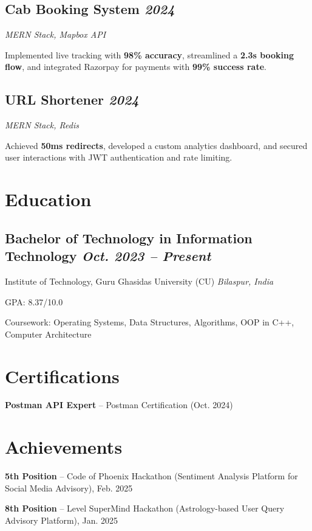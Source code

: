 \documentclass[10pt]{article}
\newcommand{\resitem}[1]{\item \RaggedRight #1}
\newcommand{\role}[1]{\textbf{#1}}
\newcommand{\company}[1]{#1}
\newcommand{\location}[1]{\textit{#1}}
\newcommand{\dates}[1]{\hfill \textit{#1}}
\begin{document}
\subsection*{\role{Cab Booking System} \dates{2024}}
\textit{MERN Stack, Mapbox API}
\begin{resumeitems}
    \resitem{Implemented live tracking with \textbf{98\% accuracy}, streamlined a \textbf{2.3s booking flow}, and integrated Razorpay for payments with \textbf{99\% success rate}.}
\end{resumeitems}

\subsection*{\role{URL Shortener} \dates{2024}}
\textit{MERN Stack, Redis}
\begin{resumeitems}
    \resitem{Achieved \textbf{50ms redirects}, developed a custom analytics dashboard, and secured user interactions with JWT authentication and rate limiting.}
\end{resumeitems}

\section*{Education}
\subsection*{\role{Bachelor of Technology in Information Technology} \dates{Oct. 2023 – Present}}
\company{Institute of Technology, Guru Ghasidas University (CU)} \location{Bilaspur, India}
\begin{resumeitems}
    \resitem{GPA: 8.37/10.0}
    \resitem{Coursework: Operating Systems, Data Structures, Algorithms, OOP in C++, Computer Architecture}
\end{resumeitems}

\section*{Certifications}
\begin{resumeitems}
    \resitem{\textbf{Postman API Expert} – Postman Certification (Oct. 2024)}
\end{resumeitems}

\section*{Achievements}
\begin{resumeitems}
    \resitem{\textbf{5th Position} – Code of Phoenix Hackathon (Sentiment Analysis Platform for Social Media Advisory), Feb. 2025}
    \resitem{\textbf{8th Position} – Level SuperMind Hackathon (Astrology-based User Query Advisory Platform), Jan. 2025}
\end{resumeitems}
\end{document}
